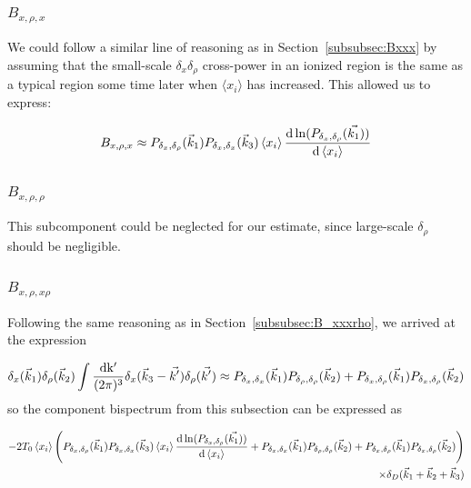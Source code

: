 \subsubsection*{$B_{x,\rho,x}$}
\label{subsubsec:Bxrhox}
We could follow a similar line of reasoning as in Section~\ref{subsubsec:Bxxx} by assuming that the small-scale $\delta_x\delta_{\rho}$ cross-power in an ionized region is the same as a typical region some time later when $\langle x_i \rangle$ has increased. This allowed us to express:

\begin{equation}
B_{x,\rho,x} \approx P_{\delta_x,\delta_{\rho}}(\vec{k}_1) P_{\delta_x,\delta_x}(\vec{k}_3)\left\langle x_i \right\rangle \frac{{\rm d} \ln (P_{\delta_x,\delta_{\rho}}(\vec{k_1}))}{{\rm d}\left\langle x_i \right\rangle}
\end{equation}

\subsubsection*{$B_{x,\rho,\rho}$}
\label{subsubsec:Bxrhorho}
This subcomponent could be neglected for our estimate, since large-scale $\delta_{\rho}$ should be negligible.

\subsubsection*{$B_{x,\rho,x\rho}$}
\label{subsubsec:Bxrhoxrho}

Following the same reasoning as in Section~\ref{subsubsec:B_xxxrho}, we arrived at the expression

\begin{equation}
\delta_x(\vec{k}_1)\delta_{\rho}(\vec{k}_2) \int \frac{\rm{d}k'}{(2\pi)^3}\delta_x(\vec{k}_3-\vec{k'})\delta_{\rho}(\vec{k'})
\approx
P_{\delta_x,\delta_x}(\vec{k}_1)P_{\delta_{\rho},\delta_{\rho}}(\vec{k}_2) + P_{\delta_x,\delta_{\rho}}(\vec{k}_1)P_{\delta_x,\delta_{\rho}}(\vec{k}_2)
\end{equation}
so the component bispectrum from this subsection can be expressed as

\begin{equation}
\begin{split}
-2 T_0 \left\langle x_i \right\rangle \left( P_{\delta_x,\delta_{\rho}}(\vec{k}_1) P_{\delta_x,\delta_x}(\vec{k}_3)\left\langle x_i \right\rangle \frac{{\rm d} \ln (P_{\delta_x,\delta_{\rho}}(\vec{k_1}))}{{\rm d}\left\langle x_i \right\rangle} +  P_{\delta_x,\delta_x}(\vec{k}_1)P_{\delta_{\rho},\delta_{\rho}}(\vec{k}_2) + P_{\delta_x,\delta_{\rho}}(\vec{k}_1)P_{\delta_x,\delta_{\rho}}(\vec{k}_2) \right) \\ 
\times \delta_D(\vec{k}_1+\vec{k}_2+\vec{k}_3)
\end{split}
\end{equation}


